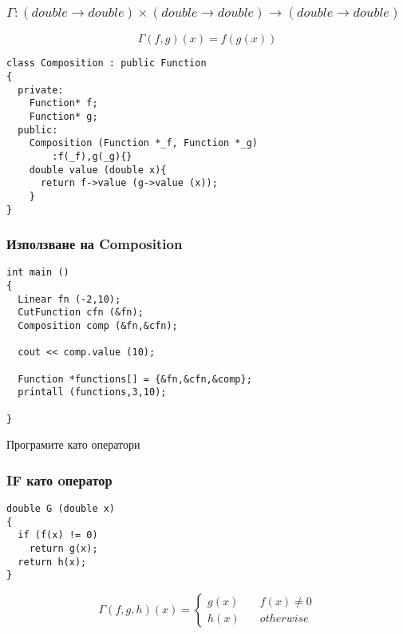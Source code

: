 \documentclass{beamer}
\begin{document}
\begin{frame}[fragile]
\frametitle{$\Gamma:(double \rightarrow double) \times (double \rightarrow double) \rightarrow(double \rightarrow double)$}

\begin{center}
$$
\Gamma(f,g)(x) = f(g(x))
$$

\begin{lstlisting}
class Composition : public Function
{
  private:
    Function* f;
    Function* g;
  public:
    Composition (Function *_f, Function *_g)
        :f(_f),g(_g){}
    double value (double x){
      return f->value (g->value (x));
    }
}
\end{lstlisting}

\end{center}


\end{frame}


\begin{frame}[fragile]
\frametitle{Използване на Composition}


\begin{flushleft}

\begin{lstlisting}
int main ()
{
  Linear fn (-2,10);
  CutFunction cfn (&fn);
  Composition comp (&fn,&cfn);

  cout << comp.value (10);

  Function *functions[] = {&fn,&cfn,&comp};
  printall (functions,3,10);

}
\end{lstlisting}

\end{flushleft}


\end{frame}












\begin{frame}
\centerline{Програмите като оператори}
\end{frame}


\begin{frame}[fragile]
\frametitle{IF като oператор}

\begin{center}

\begin{lstlisting}
double G (double x)
{
  if (f(x) != 0)
    return g(x);
  return h(x);
}
\end{lstlisting}

\end{center}


$$
\Gamma(f,g,h)(x) = \left\{
        \begin{array}{ll}
            g(x) & \quad f(x) \neq 0 \\
            h(x) & \quad otherwise
        \end{array}
    \right.
$$



\end{frame}
\end{document}
